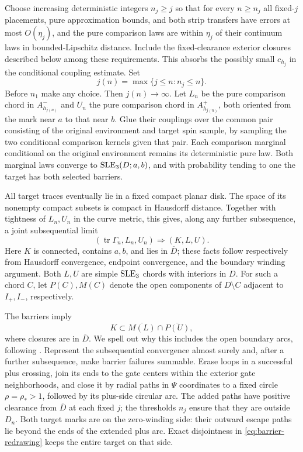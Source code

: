 Choose increasing deterministic integers $n_j\ge j$ so that for
every $n\ge n_j$ all fixed-$j$ placements, pure approximation bounds,
and both strip transfers have errors at most $O(\eta_j)$, and the
pure comparison laws are within $\eta_j$ of their continuum laws in
bounded-Lipschitz distance.  Include the fixed-clearance exterior
closures described below among these requirements.  This absorbs
the possibly small $c_{h_j}$ in the conditional coupling estimate.
Set
\begin{equation}
 j(n)=\max\{j\le n:n_j\le n\}.
 \label{eq:interface-diagonal}
\end{equation}
Before $n_1$ make any choice.  Then $j(n)\to\infty$.
Let $L_n$ be the pure comparison chord in $A_{h_{j(n)}}^-$ and
$U_n$ the pure comparison chord in $A_{h_{j(n)}}^+$, both oriented
from the mark near $a$ to that near $b$.
Glue their couplings over the common pair consisting of the original
environment and target spin sample, by sampling the two conditional
comparison kernels given that pair.  Each comparison marginal
conditional on the original environment remains its deterministic
pure law.  Both marginal laws converge to $\operatorname{SLE}_3(D;a,b)$, and
with probability tending to one the target has both selected barriers.

All target traces eventually lie in a fixed compact planar disk.
The space of its nonempty compact subsets is compact in Hausdorff
distance.  Together with tightness of $L_n,U_n$ in the curve metric,
this gives, along any further subsequence, a joint subsequential limit
\[
 (\operatorname{tr}\Gamma_n,L_n,U_n)\Longrightarrow(K,L,U).
\]
Here $K$ is connected, contains $a,b$, and lies in $\overline D$;
these facts follow respectively from Hausdorff convergence,
endpoint convergence, and the boundary winding argument.
Both $L,U$ are simple $\operatorname{SLE}_3$ chords with interiors in $D$.
For such a chord $C$, let $P(C),M(C)$ denote the open components of
$D\setminus C$ adjacent to $I_+,I_-$, respectively.

The barriers imply
\begin{equation}
 K\subset\overline{M(L)}\cap\overline{P(U)},
 \label{eq:trace-squeeze}
\end{equation}
where closures are in $\overline D$.  We spell out why this includes
the open boundary arcs, following
\cite[Section~7, ``Forbidden sides, order, and identification of the
trace'']{S}.  Represent the subsequential convergence almost surely
and, after a further subsequence, make barrier failures summable.
Erase loops in a successful plus crossing, join its ends to the gate
centers within the exterior gate neighborhoods, and close it by
radial paths in $\Psi$ coordinates to a fixed circle $\rho=\rho_*>1$,
followed by its plus-side circular arc.  The added paths have positive
clearance from $\overline D$ at each fixed $j$; the thresholds $n_j$
ensure that they are outside $D_n$.  Both target marks are on the
zero-winding side: their outward escape paths lie beyond the ends
of the extended plus arc.  Exact disjointness in
\eqref{eq:barrier-redrawing} keeps the entire target on that side.

